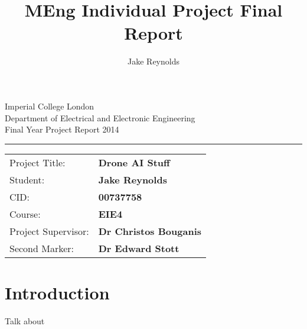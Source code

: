 \documentclass{article}
\begin{document}
\begin{titlepage}
                \setlength{\parindent}{0pt}
                \setlength{\parskip}{0pt}

                {
                                \Large
                                \raggedright
                                Imperial College London\\[17pt]
                                Department of Electrical and Electronic Engineering\\[17pt]
                                Final Year Project Report 2014\\[17pt]
 
                }

                \rule{\columnwidth}{3pt}
                \vfill
                \centering
                
                \vfill
                \setlength{\tabcolsep}{0pt}

                \begin{tabular}{p{40mm}p{\dimexpr\columnwidth-40mm}}
                                Project Title: & \textbf{Drone AI Stuff} \\[12pt]
                                Student: & \textbf{Jake Reynolds} \\[12pt]
                                CID: & \textbf{00737758} \\[12pt]
                                Course: & \textbf{EIE4} \\[12pt]
                                Project Supervisor: & \textbf{Dr Christos Bouganis} \\[12pt]
                                Second Marker: & \textbf{Dr Edward Stott} \\
                \end{tabular}
\end{titlepage}

\title{MEng Individual Project Final Report}
\author{Jake Reynolds}

\maketitle

\tableofcontents


\section{Introduction}
Talk about
\end{document}
